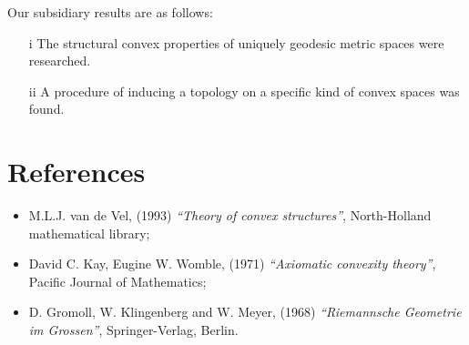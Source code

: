 \documentclass[conference]{IEEEtran}
\begin{document}
Our subsidiary results are as follows:

\begin{enumerate}
    \item[i] The structural convex properties of uniquely geodesic metric spaces were researched.
    \item[ii] A procedure of inducing a topology on a specific kind of convex spaces was found. 
\end{enumerate}



\section*{\Large{ References }}

\begin{itemize}
    \item M.L.J. van de Vel, (1993) \textit{``Theory of convex structures''}, North-Holland mathematical library;
    \item David C. Kay, Eugine W. Womble, (1971) \textit{``Axiomatic convexity theory''}, Pacific Journal of Mathematics;
    \item D. Gromoll, W. Klingenberg and W. Meyer, (1968) \textit{``Riemannsche Geometrie im Grossen''}, Springer-Verlag, Berlin. 
\end{itemize}

\end{document}
